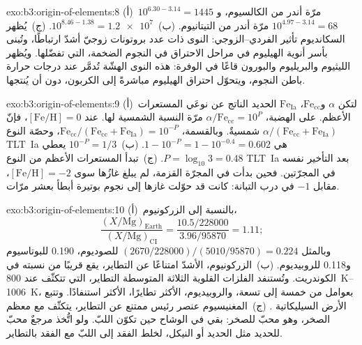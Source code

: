 \begin{solution}{exo:b3:origin-of-elements:8}
(أ)~$10^{6.30 - 3.14} = 1445$ مرّة أندر من الكالسيوم،
و$10^{4.97 - 3.14} = 68$ مرّة أندر من التيتانيوم. (ب)~$10^{8.46 - 1.38}
= \num{1.2e7}$. (ج)~يُظهر السكانديوم تأثير الفردي--الزوجي: النوى ذات
عدد بروتونات زوجيّ أشدّ ارتباطًا، وتُبنى
بأسر أنوية الهيليوم في مراحل الاحتراق في النجوم الضخمة، التي
تفضّلها. ويُظهر الليثيوم والبريليوم والبورون قاعًا في الوفرة:
هذه النوى الهشّة تُدمَّر عند درجات حرارة باطن النجوم، ويتحوّل
احتراق الهيليوم مباشرةً إلى الكربون،
دون أن يُنتجها.
\end{solution}

\begin{solution}{exo:b3:origin-of-elements:9}
(أ)~لتكن $\alpha$  و$\mathrm{Fe}_\mathrm{cc}$،
$\mathrm{Fe}_\mathrm{Ia}$ الحديد الناتج عن نوعَي المستعرات الأعظم. على
الهضبة، $\alpha/\mathrm{Fe}_\mathrm{cc} = 10^{P}$ مرّة النسبة الشمسية
لها. عند $[\mathrm{Fe/H}] = 0$، فإنّ $\alpha/(\mathrm{Fe}_\mathrm{cc} +
\mathrm{Fe}_\mathrm{Ia})$ شمسيةٌ. وبالقسمة،
$\mathrm{Fe}_\mathrm{cc}/(\mathrm{Fe}_\mathrm{cc} + \mathrm{Fe}_\mathrm{Ia})
= 10^{-P}$، وحصّة النوع \mbox{\textdir TLT Ia} هي $1 - 10^{-P} = 1 - 10^{-0.4} =
\num{0.602}$. (ب)~$10^{-P} = 1/3$ يعطي $P = \log_{10}3 = 0.48$.
(ج)~تبدأ المستعرات الأعظم من النوع \mbox{\textdir TLT Ia} بعد التأخير نفسه في المجرّتين.
فحين بدأت في المجرّة القزمة، لم يبلغ غازُها سوى
$[\mathrm{Fe/H}] = -2$، مقابل $-1$ في درب التبانة: كانت قد حوّلت غازها
إلى نجوم بوتيرة أبطأ بعشر مرّات.
\end{solution}

\begin{solution}{exo:b3:origin-of-elements:10}
(أ)~بالنسبة إلى الزركونيوم،
\[
\frac{(X/\mathrm{Mg})_\mathrm{Earth}}{(X/\mathrm{Mg})_\mathrm{CI}} =
\frac{10.5/228000}{3.96/95870} = 1.11 ;
\]
وبالمثل $(2670/228000)/(5010/95870) = 0.224$ للصوديوم،
\num{0.190} للبوتاسيوم و\num{0.118} للروبيديوم. (ب)~الزركونيوم، الأشدّ امتناعًا عن التطاير، يقع
قريبًا من نسبته في الكوندريت. وتُستنفد الفلزات القلوية الثلاثة المتوسطة التطاير،
التي تتكثّف عند \qtyrange{800}{1006}{K}، بعوامل من خمسة إلى تسعة،
والروبيديوم، الأكثر تطايرًا، الأكثر استنفادًا. وتتبع
الأرض السيليكاتية . (ج)~المغنيسيوم عنصر رئيس ممتنع عن التطاير،
يتكثّف مع معظم الصخر، وهو
محبّ للصخر: بقي في الوشاح حين تكوّن اللبّ. ولو اتُّخذ مرجعٌ محبّ للحديد
مثل الحديد أو النيكل، لخلط الفقد إلى اللبّ مع
الفقد بالتطاير.
\end{solution}

